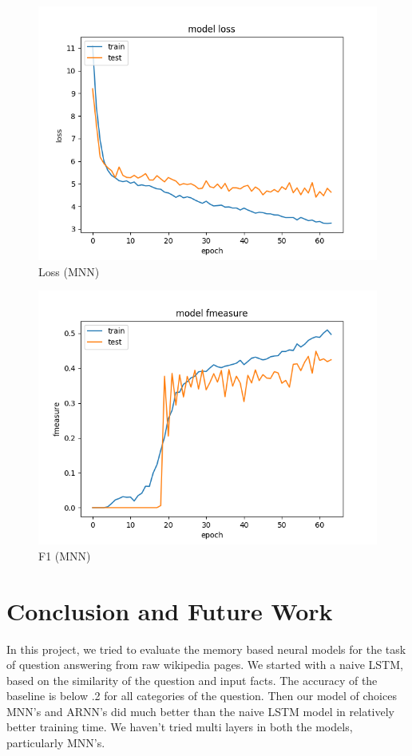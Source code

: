 \documentclass{article}
\begin{document}
\begin{figure}[h]
  \centering
  \includegraphics[scale=0.4]{loss.png}
  \caption{ Loss (MNN) }
  \label{fig:reader}
\end{figure}
\begin{figure}[h]
  \centering
  \includegraphics[scale=0.4]{f1.png}
  \caption{ F1 (MNN)}
  \label{fig:reader}
\end{figure}

\section*{Conclusion and Future Work}

In this project, we tried to evaluate the memory based neural models for the task of question answering from raw wikipedia pages. We started with a naive LSTM, based on the similarity of the question and input facts. The accuracy of the baseline is below .2 for all categories of the question. Then our model of choices MNN's and ARNN's did much better than the naive LSTM model in relatively better training time. We haven't tried multi layers in both the models, particularly MNN's. 
\end{document}
